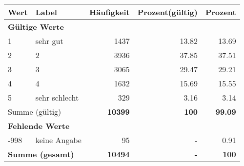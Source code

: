      \begin{longtable}{lXrrr}
     \toprule
     \textbf{Wert} & \textbf{Label} & \textbf{Häufigkeit} & \textbf{Prozent(gültig)} & \textbf{Prozent} \\
     \endhead
     \midrule
     \multicolumn{5}{l}{\textbf{Gültige Werte}}\\

     1 &
     \multicolumn{1}{X}{ sehr gut   } &


       \num{1437} &
       \num[round-mode=places,round-precision=2]{13.82} &
         \num[round-mode=places,round-precision=2]{13.69} \\

     2 &
     \multicolumn{1}{X}{ 2   } &


       \num{3936} &
       \num[round-mode=places,round-precision=2]{37.85} &
         \num[round-mode=places,round-precision=2]{37.51} \\

     3 &
     \multicolumn{1}{X}{ 3   } &


       \num{3065} &
       \num[round-mode=places,round-precision=2]{29.47} &
         \num[round-mode=places,round-precision=2]{29.21} \\

     4 &
     \multicolumn{1}{X}{ 4   } &


       \num{1632} &
       \num[round-mode=places,round-precision=2]{15.69} &
         \num[round-mode=places,round-precision=2]{15.55} \\

     5 &
     \multicolumn{1}{X}{ sehr schlecht   } &


       \num{329} &
       \num[round-mode=places,round-precision=2]{3.16} &
         \num[round-mode=places,round-precision=2]{3.14} \\
     \midrule
     \multicolumn{2}{l}{Summe (gültig)} &
       \textbf{\num{10399}} &
     \textbf{\num{100}} &
       \textbf{\num[round-mode=places,round-precision=2]{99.09}} \\
     \multicolumn{5}{l}{\textbf{Fehlende Werte}}\\
       -998 &
       keine Angabe &
         \num{95} &
        - &
         \num[round-mode=places,round-precision=2]{0.91} \\
     \midrule
     \multicolumn{2}{l}{\textbf{Summe (gesamt)}} &
          \textbf{\num{10494}} &
        \textbf{-} &
        \textbf{\num{100}} \\
     \bottomrule
     \end{longtable}
     
